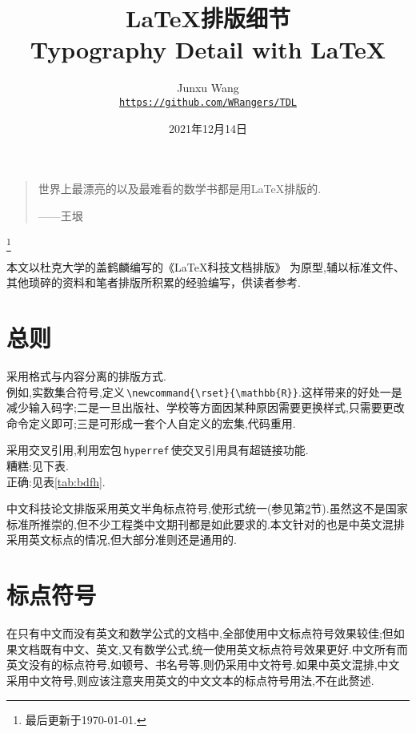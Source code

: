 \documentclass[a4paper]{article}
\title{{\fontspec{Palatino}\LaTeX{}}{\CJKfontspec{方正小标宋简体}排版细节}\\%
\fontspec{Palatino}Typography Detail with \LaTeX}
\author{{\small\fontspec{Zapfino}Junxu Wang}\\%
\href{https://github.com/WRangers/TDL}{\texttt{https://github.com/WRangers/TDL}}}
\date{2021年12月14日}
\newcommand{\sref}[1]{\CJKecglue\ref{#1}}
\newcommand{\dref}[1]{\CJKecglue\ref{#1}\CJKecglue}
\newcommand{\scite}[1]{\CJKecglue\cite{#1}}
\begin{document}
\maketitle

\begin{quote}
	世界上最漂亮的以及最难看的数学书都是用\LaTeX{}排版的.\eop

	\hfill ——王垠
\end{quote}
\renewcommand\thefootnote{}
\footnote{最后更新于\today.\eop}
\setcounter{footnote}{0}
\renewcommand\thefootnote{\arabic{footnote}}

本文以杜克大学的盖鹤麟编写的《\LaTeX{}科技文档排版》\cite{2} 为原型,辅以标准文件、其他琐碎的资料和笔者排版所积累的经验编写，供读者参考.\eop

\section{总则}
\begin{compactitem}[\hspace{1.02em}$\bullet$]
	\item 采用格式与内容分离的排版方式.\\
	例如,实数集合符号,定义\,\verb|\newcommand{\rset}{\mathbb{R}}|.这样带来的好处一是减少输入码字;二是一旦出版社、学校等方面因某种原因需要更换样式,只需要更改命令定义即可;三是可形成一套个人自定义的宏集,代码重用.
	\item 采用交叉引用,利用宏包\,\verb|hyperref|\,使交叉引用具有超链接功能.\\
	\textsf{糟糕}:见下表.\\
	\textsf{正确}:见表\sref{tab:bdfh}.
	\item 中文科技论文排版采用英文半角标点符号,使形式统一(参见第\dref{sec:bdfh}节).虽然这不是国家标准所推崇的,但不少工程类中文期刊都是如此要求的.本文针对的也是中英文混排采用英文标点的情况,但大部分准则还是通用的.\eop
\end{compactitem}

\section{标点符号}\label{sec:bdfh}
在只有中文而没有英文和数学公式的文档中,全部使用中文标点符号效果较佳;但如果文档既有中文、英文,又有数学公式,统一使用英文标点符号效果更好.中文所有而英文没有的标点符号,如顿号、书名号等,则仍采用中文符号.如果中英文混排,中文采用中文符号,则应该注意夹用英文的中文文本的标点符号用法\scite{4},不在此赘述.\eop
\end{document}
